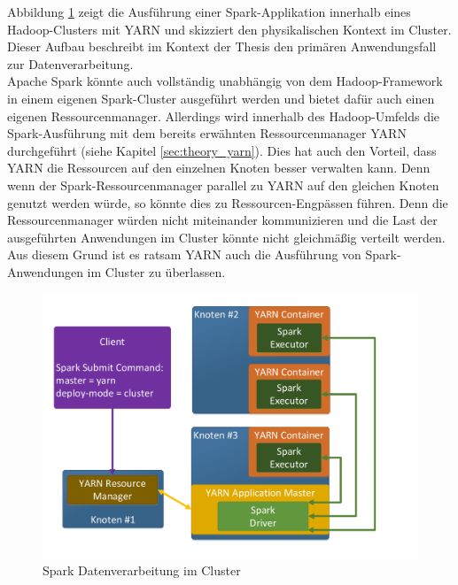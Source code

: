 \noindent
Abbildung \ref{fig:spark_cluster_architecture} zeigt die Ausführung einer Spark-Applikation innerhalb eines Hadoop-Clusters mit YARN und skizziert den physikalischen Kontext im Cluster. Dieser Aufbau beschreibt im Kontext der Thesis den primären Anwendungsfall zur Datenverarbeitung.\\ 
Apache Spark könnte auch vollständig unabhängig von dem Hadoop-Framework in einem eigenen Spark-Cluster ausgeführt werden und bietet dafür auch einen eigenen Ressourcenmanager. Allerdings wird innerhalb des Hadoop-Umfelds die Spark-Ausführung mit dem bereits erwähnten Ressourcenmanager YARN durchgeführt (siehe Kapitel \ref{sec:theory_yarn}). Dies hat auch
den Vorteil, dass YARN die Ressourcen auf den einzelnen Knoten besser verwalten kann. Denn wenn der Spark-Ressourcenmanager parallel zu YARN auf den gleichen Knoten genutzt werden würde, so könnte dies zu Ressourcen-Engpässen führen. Denn die Ressourcenmanager würden nicht miteinander kommunizieren und die Last der ausgeführten Anwendungen im Cluster könnte nicht gleichmäßig verteilt werden. Aus diesem Grund ist es ratsam YARN auch die Ausführung von Spark-Anwendungen im Cluster zu überlassen.\\

\begin{figure}[ht]
  \centering
  \includegraphics[width=\textwidth]{./resource/spark_cluster_architecture.pdf}
  \caption{Spark Datenverarbeitung im Cluster}
  \label{fig:spark_cluster_architecture}
\end{figure}

